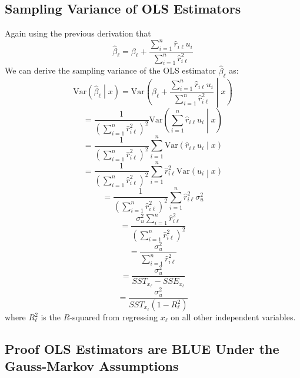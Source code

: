\documentclass[11pt]{article}
\begin{document}
\subsection*{Sampling Variance of OLS Estimators}
Again using the previous derivation that$$\hat{\beta}_\ell=\beta_\ell+\frac{\sum_{i=1}^{n}\hat{r}_{i\ell}u_i}{\sum_{i=1}^{n}\hat{r}_{i\ell}^2}$$
We can derive the sampling variance of the OLS estimator $\hat{\beta}_\ell$ as:
$$\text{Var}\left(\hat{\beta}_\ell\middle|x\right)=\text{Var}\left(\beta_\ell+\frac{\sum_{i=1}^{n}\hat{r}_{i\ell}u_i}{\sum_{i=1}^{n}\hat{r}_{i\ell}^2}\middle|x\right)$$
$$=\frac{1}{\left(\sum_{i=1}^{n}\hat{r}_{i\ell}^2\right)^2}\text{Var}\left(\sum_{i=1}^{n}\hat{r}_{i\ell}u_i\middle|x\right)$$
$$=\frac{1}{\left(\sum_{i=1}^{n}\hat{r}_{i\ell}^2\right)^2}\sum_{i=1}^{n}\text{Var}\left(\hat{r}_{i\ell}u_i\middle|x\right)$$
$$=\frac{1}{\left(\sum_{i=1}^{n}\hat{r}_{i\ell}^2\right)^2}\sum_{i=1}^{n}\hat{r}_{i\ell}^2\text{Var}\left(u_i\middle|x\right)$$
$$=\frac{1}{\left(\sum_{i=1}^{n}\hat{r}_{i\ell}^2\right)^2}\sum_{i=1}^{n}\hat{r}_{i\ell}^2\sigma_u^2$$
$$=\frac{\sigma_u^2\sum_{i=1}^{n}\hat{r}_{i\ell}^2}{\left(\sum_{i=1}^{n}\hat{r}_{i\ell}^2\right)^2}$$
$$=\frac{\sigma_u^2}{\sum_{i=1}^{n}\hat{r}_{i\ell}^2}$$
$$=\frac{\sigma_u^2}{SST_{x_\ell}-SSE_{x_\ell}}$$
$$=\frac{\sigma_u^2}{SST_{x_\ell}\left(1-R_\ell^2\right)}$$where $R_\ell^2$ is the $R$-squared from regressing $x_\ell$ on all other independent variables.

\newpage

\subsection*{Proof OLS Estimators are BLUE Under the Gauss-Markov Assumptions}
\end{document}
